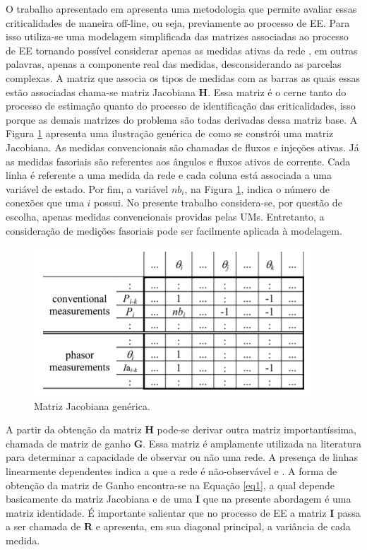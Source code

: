 \documentclass[12pt]{article}
\begin{document}
O trabalho apresentado em \cite{Hand07} apresenta uma metodologia que permite avaliar essas criticalidades de maneira off-line, ou seja, previamente ao processo de EE. Para isso utiliza-se uma modelagem simplificada das matrizes associadas ao processo de EE tornando possível considerar apenas as medidas ativas da rede \cite{Abur04}, em outras palavras, apenas a componente real das medidas, desconsiderando as parcelas complexas. A matriz que associa os tipos de medidas com as barras as quais essas estão associadas chama-se matriz Jacobiana $\mathbf{H}$. Essa matriz é o cerne tanto do processo de estimação quanto do processo de identificação das criticalidades, isso porque as demais matrizes do problema são todas derivadas dessa matriz base. A Figura \ref{fig2} apresenta uma ilustração genérica de como se constrói uma matriz Jacobiana. As medidas convencionais são chamadas de fluxos e injeções ativas. Já as medidas fasoriais são referentes aos ângulos e fluxos ativos de corrente. Cada linha é referente a uma medida da rede e cada coluna está associada a uma variável de estado. Por fim, a variável $nb_i$, na Figura \ref{fig2}, indica o número de conexões que uma $i$ possui. No presente trabalho considera-se, por questão de escolha, apenas medidas convencionais providas pelas UMs. Entretanto, a consideração de medições fasoriais pode ser facilmente aplicada à modelagem.

\begin{figure}[H]
	\centering 
	\includegraphics[scale=1.2]{figuras/Jacob.jpg}
	\caption{Matriz Jacobiana genérica.\cite{AbelTese16}}
	\label{fig2} %
\end{figure}

A partir da obtenção da matriz $\mathbf{H}$ pode-se derivar outra matriz importantíssima, chamada de matriz de ganho $\mathbf{G}$. Essa matriz é amplamente utilizada na literatura para determinar a capacidade de observar ou não uma rede. A presença de linhas linearmente dependentes indica a que a rede é não-observável \cite{Mont85} e \cite{AburObserv00}. A forma de obtenção da matriz de Ganho encontra-se na Equação \ref{eq1}, a qual depende basicamente da matriz Jacobiana e de uma $\mathbf{I}$ que na presente abordagem é uma matriz identidade. É importante salientar que no processo de EE a matriz $\mathbf{I}$ passa a ser chamada de $\mathbf{R}$ e  apresenta, em sua diagonal principal, a variância de cada medida.
\end{document}
